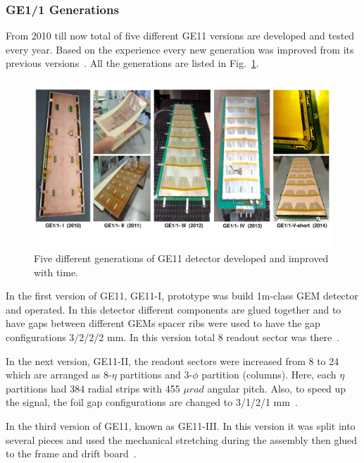 \subsubsection{GE1/1 Generations} %
\label{ssub:ge1_1_generations}
From 2010 till now total of five different GE11 versions are developed and tested every year. Based on the experience every new generation was improved from its previous versions~\cite{Abbaneo2013a}. All the generations are listed in Fig.~\ref{fig:GE11generations}.
\begin{figure}[!htbp]
    \centering
    \includegraphics[width=1.0\textwidth]{figures/GEM/5-prototype-generations.pdf}
    \caption{Five different generations of GE11 detector developed and improved with time.}
    \label{fig:GE11generations}
\end{figure}

In the first version of GE11, GE11-I, prototype was build 1m-class GEM detector and operated. In this detector different components are glued together and to have gaps between different GEMs spacer ribs were used to have the gap configurations 3/2/2/2 mm. In this version total 8 readout sector was there~\cite{Abbaneo2010}.

In the next version, GE11-II, the readout sectors were increased from 8 to 24 which are arranged as 8-$\eta$ partitions and 3-$\phi$ partition (columns). Here, each $\eta$ partitions had 384 radial strips with 455 $\mu rad$ angular pitch. Also, to speed up the signal, the foil gap configurations are changed to 3/1/2/1 mm~\cite{Abbaneo2011}.

In the third version of GE11, known as GE11-III. In this version it was split into several pieces and used the mechanical stretching during the assembly then glued to the frame and drift board~\cite{Abbaneoo2012}.

